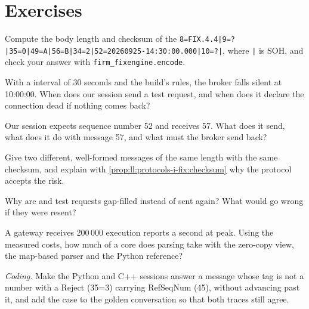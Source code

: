 \section{Exercises}

\begin{exercise}[$\star$]\label{exo:ll:protocols-i-fix:1}
Compute the body length and checksum of the  \texttt{8=FIX.4.4|9=?|35=0|49=A|56=B|34=2|52=20260925-14:30:00.000|10=?|},
where \texttt{|} is SOH, and check your answer with \texttt{firm\_fixengine.encode}.
\end{exercise}

\begin{exercise}[$\star$]\label{exo:ll:protocols-i-fix:2}
With a  interval of 30 seconds and the build's rules, the broker falls silent at 10:00:00. When does our session send a
test request, and when does it declare the connection dead if nothing comes back?
\end{exercise}

\begin{exercise}[$\star$]\label{exo:ll:protocols-i-fix:3}
Our session expects sequence number 52 and receives 57. What does it send, what does it do with message 57, and what must the
broker send back?
\end{exercise}

\begin{exercise}[$\star\star$]\label{exo:ll:protocols-i-fix:4}
Give two different, well-formed messages of the same length with the same checksum, and explain with
\cref{prop:ll:protocols-i-fix:checksum} why the protocol accepts the risk.
\end{exercise}

\begin{exercise}[$\star\star$]\label{exo:ll:protocols-i-fix:5}
Why are  and test requests gap-filled instead of sent again? What would go wrong if they were resent?
\end{exercise}

\begin{exercise}[$\star\star$]\label{exo:ll:protocols-i-fix:6}
A gateway receives 200\,000 execution reports a second at peak. Using the measured costs, how much of a core does parsing take
with the zero-copy view, the map-based parser and the Python reference?
\end{exercise}

\begin{exercise}[$\star\star\star$]\label{exo:ll:protocols-i-fix:7}
\emph{Coding.} Make the Python and C++ sessions answer a message whose tag is not a number with a Reject (35=3) carrying
RefSeqNum (45), without advancing past it, and add the case to the golden conversation so that both traces still agree.
\end{exercise}

